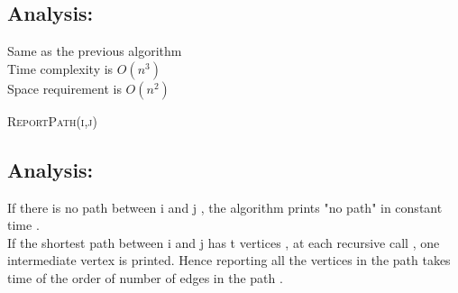 \documentclass[11pt]{article}
\begin{document}
\subsection*{Analysis: }
Same as the previous algorithm\\
Time complexity is $O(n^3)$ \\
Space requirement is $O(n^2)$ \\
\linesnumbered
\begin{algorithm}
\caption{\textsc{ReportPath(i,j)}}
\end{algorithm}

\subsection*{Analysis: }
If there is no path between i and j , the algorithm prints "no path" in constant time . \\
If the shortest path between i and j has t vertices , at each recursive call , one intermediate vertex is printed.
Hence reporting all the vertices in the path takes time of the order of number of edges in the path .\\
\end{document}
